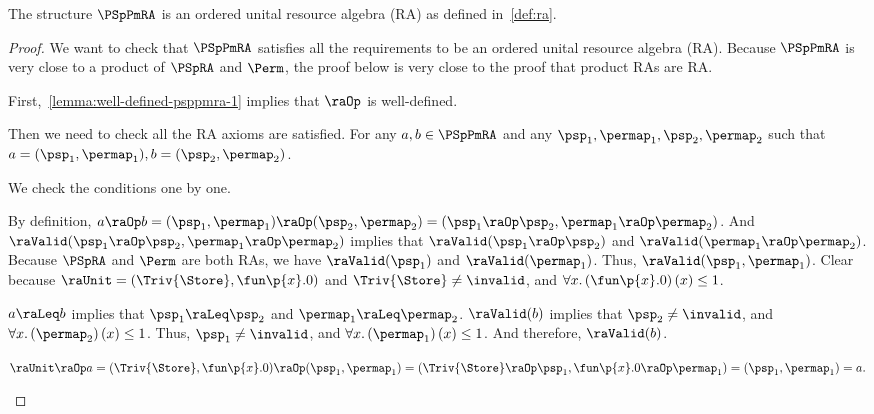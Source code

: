 \begin{lemma}
  \label{lemma:psppm-ra}
  The structure $\PSpPmRA$ is an ordered unital resource algebra (RA) as defined
  in~\cref{def:ra}.
\end{lemma}

\begin{proof}
  We want to check that $\PSpPmRA$ satisfies all the requirements to be
  an ordered unital resource algebra (RA).
  Because $\PSpPmRA$ is very close to a product of $\PSpRA$ and $\Perm$,
  the proof below is very close to the proof that product RAs
  are RA.

  First,~\cref{lemma:well-defined-psppmra-1} implies that $\raOp$
  is well-defined.

  Then we need to check all the RA axioms are satisfied.
  For any $a, b \in \PSpPmRA$ and any $\psp_1, \permap_1, \psp_2, \permap_2$ such
  that $a = (\psp_1, \permap_1), b = (\psp_2, \permap_2)$.

  We check the conditions one by one.
  \begin{induction}
      By definition,
      $a \raOp b = (\psp_1, \permap_1) \raOp (\psp_2, \permap_2)
      = (\psp_1 \raOp \psp_2, \permap_1 \raOp \permap_2)$.
      And $\raValid(\psp_1 \raOp \psp_2, \permap_1 \raOp \permap_2)$
      implies that
      $\raValid(\psp_1 \raOp \psp_2)$ and
      $\raValid(\permap_1 \raOp \permap_2)$.
      Because $\PSpRA$ and $\Perm$ are both RAs,
      we have $\raValid(\psp_1)$ and $\raValid(\permap_1)$.
      Thus, $\raValid(\psp_1, \permap_1)$.
      Clear because $\raUnit = (\Triv{\Store}, \fun \p{x}. 0)$
      and $\Triv{\Store} \neq \invalid$, and
      $\forall x. \left(\fun \p{x}. 0\right)(x) \leq 1$.

      $a \raLeq b $ implies that
      $\psp_1 \raLeq \psp_2$ and $\permap_1 \raLeq \permap_2$.
      $\raValid(b)$ implies that
       $\psp_2 \neq \invalid$, and
      $\forall x. \left(\permap_2 \right)(x) \leq 1$.
      Thus,  $\psp_1 \neq \invalid$, and
      $\forall x. \left(\permap_1 \right)(x) \leq 1$.
      And therefore, $\raValid(b)$.

    \step[Condition~$\raUnit \raOp a = a$]
$
        \raUnit \raOp a
        = (\Triv{\Store}, \fun \p{x}. 0) \raOp (\psp_1, \permap_1) \\
        =  (\Triv{\Store} \raOp \psp_1,  \fun \p{x}. 0 \raOp \permap_1) \\
        = (\psp_1, \permap_1) = a.
      $


\end{induction}
\end{proof}
